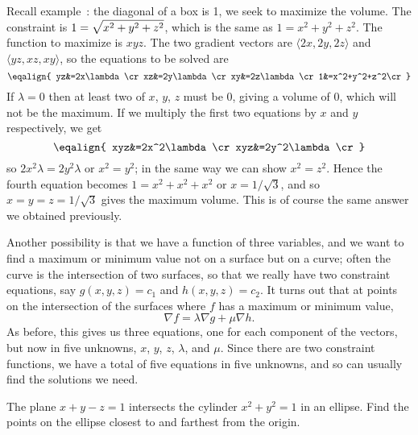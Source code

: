 \example 
Recall example~: the diagonal of a box is 1,
we seek to maximize the volume. The constraint is $\displaystyle
1=\sqrt{x^2+y^2+z^2}$, which is the same as
$1=x^2+y^2+z^2$. The function to maximize is $xyz$. The two gradient
vectors are $\langle 2x,2y,2z\rangle$ and $\langle yz,xz,xy\rangle$,
so the equations to be solved are
$$\eqalign{
yz&=2x\lambda\cr
xz&=2y\lambda\cr
xy&=2z\lambda\cr
1&=x^2+y^2+z^2\cr
}$$
If $\lambda=0$ then at least two of $x$, $y$, $z$ must be 0, giving a
volume of 0, which will not be the maximum. If we multiply the first
two equations by $x$ and $y$ respectively, we get
$$\eqalign{
xyz&=2x^2\lambda\cr
xyz&=2y^2\lambda\cr
}$$
so $2x^2\lambda=2y^2\lambda$ or $x^2=y^2$; in the same way we can show
$x^2=z^2$. Hence the fourth equation becomes
$1=x^2+x^2+x^2$ or $x=1/\sqrt3$, and so $x=y=z=1/\sqrt3$ gives the
maximum volume. This is of course the same answer we obtained
previously.
\endexample

Another possibility is that we have a function of three variables, and
we want to find a maximum or minimum value not on a surface but on a
curve; often the curve is the intersection of two surfaces, so that we
really have two constraint equations, say $g(x,y,z)=c_1$ and
$h(x,y,z)=c_2$. It turns out that at points on the intersection of the
surfaces where $f$ has a maximum or minimum value,
$$\nabla f=\lambda\nabla g+\mu \nabla h.$$
As before, this gives us three equations, one for each component of
the vectors, but now in five unknowns, $x$, $y$, $z$, $\lambda$, and
$\mu$. Since there are two constraint functions, we have a total of
five equations in five unknowns, and so can usually find the solutions
we need.

\example The plane $x+y-z=1$ intersects the cylinder $x^2+y^2=1$ in an
ellipse. Find the points on the ellipse closest to and farthest from
the origin.

